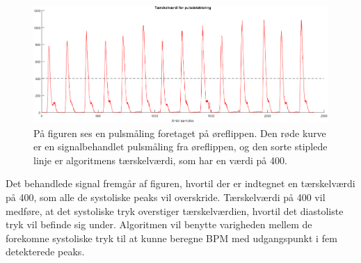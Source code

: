 \begin{figure}[H]
	\centering
	\includegraphics[scale=0.4]{figures/cDesign/puls_taerskel.png}
	\caption{På figuren ses en pulsmåling foretaget på øreflippen. Den røde kurve er en signalbehandlet pulsmåling fra øreflippen, og den sorte stiplede linje er algoritmens tærskelværdi, som har en værdi på 400.}
	\label{fig:taerskel_puls}
\end{figure} \vspace{-0.5cm}
Det behandlede signal fremgår af figuren, hvortil der er indtegnet en tærskelværdi på 400, som alle de systoliske peaks vil overskride. Tærskelværdi på 400 vil medføre, at det systoliske tryk overstiger tærskelværdien, hvortil det diastoliste tryk vil befinde sig under. Algoritmen vil benytte varigheden mellem de forekomne systoliske tryk til at kunne beregne BPM med udgangspunkt i fem detekterede peaks. 

